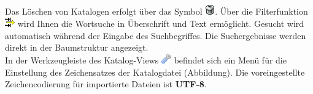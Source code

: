 \documentclass[a4paper,10pt]{book}
\begin{document}
\newline\\
Das Löschen von Katalogen erfolgt über das Symbol \includegraphics[height=2ex]{Icon/Delete.png}. Über die Filterfunktion \includegraphics[height=2ex]{Icon/Filter.png} wird Ihnen die Wortsuche in
Überschrift und Text ermöglicht. Gesucht wird automatisch während der Eingabe des Suchbegriffes. Die Suchergebnisse werden direkt in der Baumstruktur angezeigt.
\newline\\
In der Werkzeugleiste des Katalog-Views \includegraphics[height=2ex]{Icon/Control_Kataloge.png} befindet sich ein Menü für die Einstellung des Zeichensatzes der Katalogdatei (Abbildung).
Die voreingestellte Zeichencodierung für importierte Dateien ist \textbf{UTF-8}.
\end{document}
